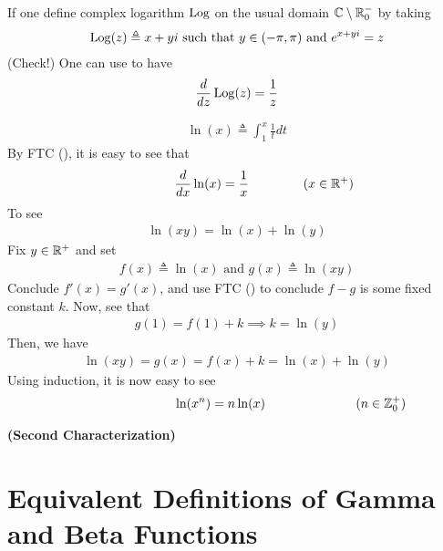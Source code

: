 \documentclass{report}
\begin{document}
\begin{mdframed}
If one define complex logarithm $\operatorname{Log}$ on the usual domain $\mathbb{C} \setminus \mathbb{R}_0^-$ by taking 
\begin{align*}
\operatorname{Log} (z)\triangleq x+ yi\text{ such that }y \in (- \pi  ,\pi )\text{ and }e^{x+y i}=z
\end{align*}
(Check!) One can use  to have 
\begin{align*}
\frac{d}{dz}\operatorname{Log} (z)=\frac{1}{z}
\end{align*}
\end{mdframed}
\begin{mdframed}



\begin{align*}
\ln (x)\triangleq \int_1^x \frac{1}{t}dt
\end{align*}
By FTC (), it is easy to see that 
 \begin{align*}
\hspace{1.5cm}\frac{d}{dx}\ln (x)=\frac{1}{x}\hspace{1.5cm}(x\in\mathbb{R}^+)
\end{align*}
To see 
\begin{align*}
\ln (xy)=\ln (x)+ \ln (y)
\end{align*}
Fix $y\in\mathbb{R}^+$ and set 
\begin{align*}
f(x)\triangleq \ln (x)\text{ and }g(x)\triangleq \ln(xy)
\end{align*}
Conclude $f'(x)=g'(x)$, and use FTC () to conclude $f-g$ is some fixed constant $k$. Now, see that 
\begin{align*}
g(1)=f(1)+k \implies k=\ln(y)
\end{align*}
Then, we have 
\begin{align*}
\ln(xy)=g(x)=f(x)+k=\ln (x)+ \ln (y)
\end{align*}
Using induction, it is now easy to see 
\begin{align*}
  \hspace{3cm}\ln (x^n)=n \ln (x)\hspace{2.5cm}(n\inz_0^+)
\end{align*}
\end{mdframed}
\begin{theorem}
\textbf{(Second Characterization)}
\end{theorem}
\section{Equivalent Definitions of Gamma and Beta Functions}
\end{document}
